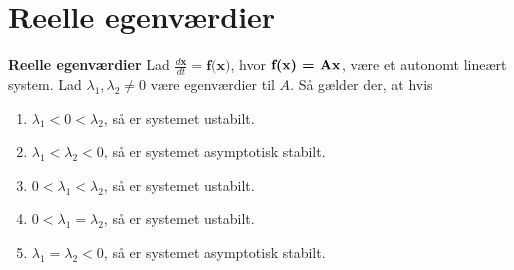 \section{Reelle egenværdier}

\begin{thmx} \textbf{Reelle egenværdier} %
\newline
Lad $\frac{d\textbf{x}}{dt} = \textbf{f(x)}$, hvor $\textbf{f(x) = A\textbf{x}}$, være et autonomt lineært system. Lad $\lambda_1,\lambda_2\neq 0$ være egenværdier til $A$. Så gælder der, at hvis
\begin{enumerate}
    \item $\lambda_1<0<\lambda_2$, så er systemet ustabilt. 
    \item $\lambda_1<\lambda_2<0$, så er systemet asymptotisk stabilt.
    \item $0<\lambda_1<\lambda_2$, så er systemet ustabilt.
    \item $0<\lambda_1=\lambda_2$, så er systemet ustabilt.
    \item $\lambda_1=\lambda_2 < 0$, så er systemet asymptotisk stabilt.
\end{enumerate}
\end{thmx}

